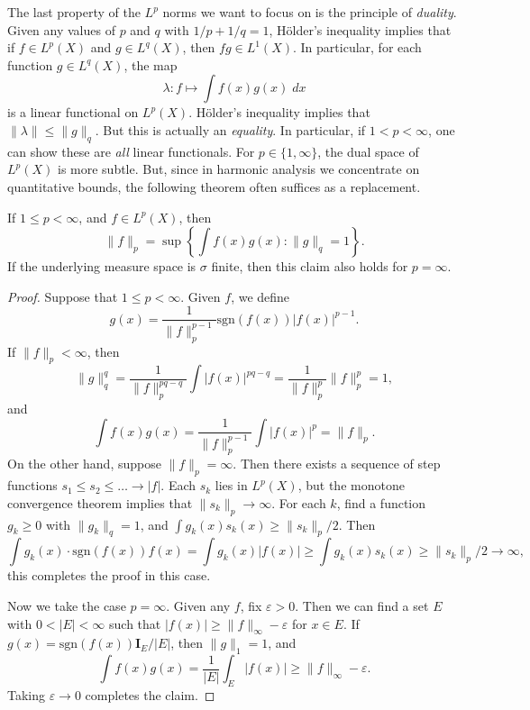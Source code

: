 The last property of the $L^p$ norms we want to focus on is the principle of \emph{duality}. Given any values of $p$ and $q$ with $1/p + 1/q = 1$, H\"{o}lder's inequality implies that if $f \in L^p(X)$ and $g \in L^q(X)$, then $fg \in L^1(X)$. In particular, for each function $g \in L^q(X)$, the map
%
\[ \lambda: f \mapsto \int f(x)g(x)\; dx \]
%
is a linear functional on $L^p(X)$. H\"{o}lder's inequality implies that $\| \lambda \| \leq \| g \|_q$. But this is actually an \emph{equality}. In particular, if $1 < p < \infty$, one can show these are \emph{all} linear functionals. For $p \in \{ 1, \infty \}$, the dual space of $L^p(X)$ is more subtle. But, since in harmonic analysis we concentrate on quantitative bounds, the following theorem often suffices as a replacement.

\begin{theorem}
    If $1 \leq p < \infty$, and $f \in L^p(X)$, then
    \[ \| f \|_p = \sup \left\{ \int f(x)g(x) : \| g \|_q = 1 \right\}. \]
    If the underlying measure space is $\sigma$ finite, then this claim also holds for $p = \infty$.
\end{theorem}
\begin{proof}
    Suppose that $1 \leq p < \infty$. Given $f$, we define
    \[ g(x) = \frac{1}{\| f \|_p^{p-1}} \text{sgn}(f(x)) |f(x)|^{p-1}. \]
    If $\| f \|_p < \infty$, then
    \[ \| g \|_q^q = \frac{1}{\| f \|_p^{pq - q}} \int |f(x)|^{pq-q} = \frac{1}{\| f \|_p^p} \| f \|_p^p = 1, \]
    and
    \[ \int f(x) g(x) = \frac{1}{\| f \|_p^{p-1}} \int |f(x)|^p = \| f \|_p. \]
    On the other hand, suppose $\| f \|_p = \infty$. Then there exists a sequence of step functions $s_1 \leq s_2 \leq \dots \to |f|$. Each $s_k$ lies in $L^p(X)$, but the monotone convergence theorem implies that $\| s_k \|_p \to \infty$. For each $k$, find a function $g_k \geq 0$ with $\| g_k \|_q = 1$, and $\int g_k(x) s_k(x) \geq \| s_k \|_p / 2$. Then
    \[ \int g_k(x) \cdot \text{sgn}(f(x)) f(x) = \int g_k(x) |f(x)| \geq \int g_k(x) s_k(x) \geq \| s_k \|_p / 2 \to \infty, \]
    this completes the proof in this case.

    Now we take the case $p = \infty$. Given any $f$, fix $\varepsilon > 0$. Then we can find a set $E$ with $0 < |E| < \infty$ such that $|f(x)| \geq \| f \|_\infty - \varepsilon$ for $x \in E$. If $g(x) = \text{sgn}(f(x)) \mathbf{I}_E / |E|$, then $\| g \|_1 = 1$, and
    \[ \int f(x) g(x) = \frac{1}{|E|} \int_E |f(x)| \geq \| f \|_\infty - \varepsilon. \]
    Taking $\varepsilon \to 0$ completes the claim.
\end{proof}

